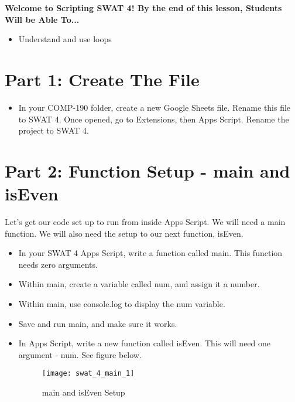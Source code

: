 \documentclass{article}
\newcommand{\AName}{Scripting SWAT 4}
\begin{document}
\textbf{Welcome to \AName!  By the end of this lesson, Students Will be Able To...}
\begin{itemize}
    \item Understand and use loops
\end{itemize}


\section*{Part 1: Create The File}
\begin{itemize}
    \item In your COMP-190 folder, create a new Google Sheets file.  Rename this file to SWAT 4.  Once opened, go to Extensions, then Apps Script.  Rename the project to SWAT 4.
\end{itemize}

\section*{Part 2: Function Setup - main and isEven}
Let's get our code set up to run from inside Apps Script.  We will need a main function.  We will also need the setup to our next function, isEven.
\begin{itemize}
	\item In your SWAT 4 Apps Script, write a function called main.  This function needs zero arguments.
	\item Within main, create a variable called num, and assign it a number.
	\item Within main, use console.log to display the num variable.
	\item Save and run main, and make sure it works.
	\item In Apps Script, write a new function called isEven.  This will need one argument - num.  See figure below.
	\begin{figure}[H]
  		\centering
  		\texttt{[image: swat\_4\_main\_1]}
  		\caption{main and isEven Setup}
	\end{figure}
\end{itemize}
\end{document}
